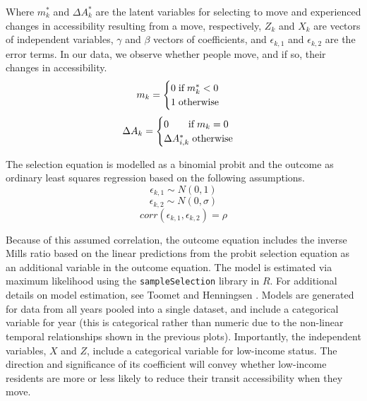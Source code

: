 Where $m_k^*$ and $\Delta A_{k}^*$ are the latent variables for selecting to move and experienced changes in accessibility resulting from a move, respectively, $Z_k$ and $X_{k}$ are vectors of independent variables, $\gamma$ and $\beta$ vectors of coefficients, and  $\epsilon_{k,1}$ and $\epsilon_{k,2}$ are the error terms. In our data, we observe whether people move, and if so, their changes in accessibility. 
\begin{equation}
m_k = 
\begin{cases} 
0 \hspace{1mm} \text{if} \hspace{1mm} m_k^* < 0 \\
1 \hspace{1mm} \text{otherwise}
\end{cases}
\end{equation}
\begin{equation}
\Delta A_{k}  = 
\begin{cases} 
0 \hspace{7mm} \text{if} \hspace{1mm} m_k = 0 \\
\Delta A_{i,k}^* \hspace{1mm} \text{otherwise}
\end{cases}
\end{equation}

The selection equation is modelled as a binomial probit and the outcome as ordinary least squares regression based on the following assumptions.
\begin{equation}
\epsilon_{k,1} \sim N(0,1)
\end{equation}
\begin{equation}
\epsilon_{k,2} \sim N(0,\sigma)
\end{equation}
\begin{equation}
corr(\epsilon_{k,1},\epsilon_{k,2}) = \rho 
\end{equation}

Because of this assumed correlation, the outcome equation includes the inverse Mills ratio based on the linear predictions from the probit selection equation as an additional variable in the outcome equation. The model is estimated via maximum likelihood using the \texttt{sampleSelection} library in $R$. For additional details on model estimation, see Toomet and Henningsen \cite{toomet2008sample}. Models are generated for data from all years pooled into a single dataset, and include a categorical variable for year (this is categorical rather than numeric due to the non-linear temporal relationships shown in the previous plots). Importantly, the independent variables, $X$ and $Z$, include a categorical variable for low-income status. The direction and significance of its coefficient will convey whether low-income residents are more or less likely to reduce their transit accessibility when they move. 


